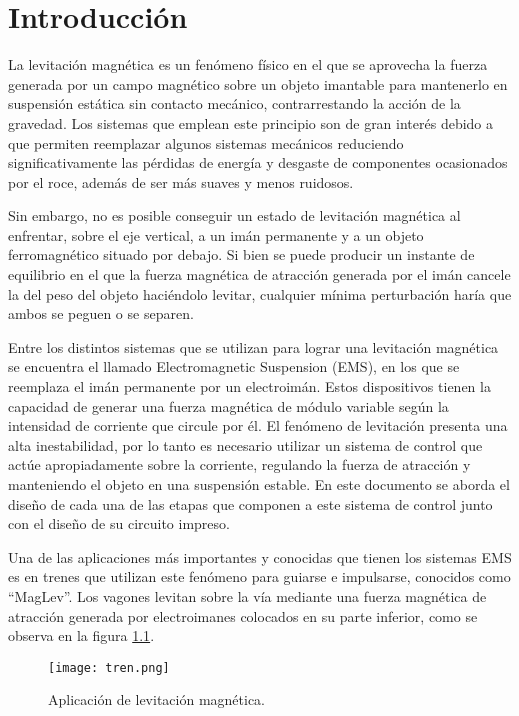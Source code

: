 \chapter{Introducción}  \label{cap:Introducción}

La levitación magnética es un fenómeno físico en el que se aprovecha la fuerza generada por un campo magnético sobre un objeto imantable para mantenerlo en suspensión estática sin contacto mecánico, contrarrestando la acción de la gravedad. Los sistemas que emplean este principio son de gran interés debido a que permiten reemplazar algunos sistemas mecánicos reduciendo significativamente las pérdidas de energía y desgaste de componentes ocasionados por el roce, además de ser más suaves y menos ruidosos.

Sin embargo, no es posible conseguir un estado de levitación magnética al enfrentar, sobre el eje vertical, a un imán permanente y a un objeto ferromagnético situado por debajo. Si bien se puede producir un instante de equilibrio en el que la fuerza magnética de atracción generada por el imán cancele la del peso del objeto haciéndolo levitar, cualquier mínima perturbación haría que ambos se peguen o se separen.

Entre los distintos sistemas que se utilizan para lograr una levitación magnética se encuentra el llamado Electromagnetic Suspension (EMS), en los que se reemplaza el imán permanente por un electroimán. Estos dispositivos tienen la capacidad de generar una fuerza magnética de módulo variable según la intensidad de corriente que circule por él. El fenómeno de levitación presenta una alta inestabilidad, por lo tanto es necesario utilizar un sistema de control que actúe apropiadamente sobre la corriente, regulando la fuerza de atracción y manteniendo el objeto en una suspensión estable. En este documento se aborda el diseño de cada una de las etapas que componen a este sistema de control junto con el diseño de su circuito impreso. 

Una de las aplicaciones más importantes y conocidas que tienen los sistemas EMS es en trenes que utilizan este fenómeno para guiarse e impulsarse, conocidos como ``MagLev''. Los vagones levitan sobre la vía mediante una fuerza magnética de atracción generada por electroimanes colocados en su parte inferior, como se  observa en la figura \ref{fig:img_tren}. 


\begin{figure}[H]
	\centering
	\texttt{[image: tren.png]}
	\caption{Aplicación de levitación magnética.}
	\label{fig:img_tren}
\end{figure}

